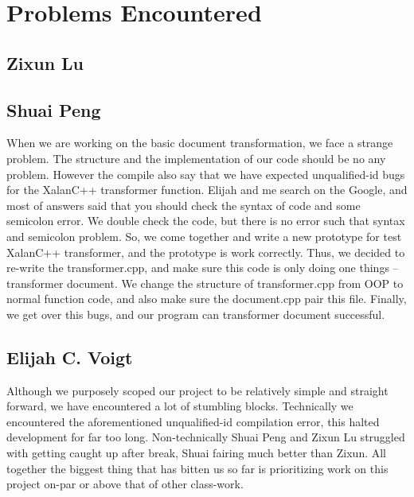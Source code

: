 \section{Problems Encountered}

\subsection{Zixun Lu}

\subsection{Shuai Peng}

When we are working on the basic document transformation, we face a strange problem.
The structure and the implementation of our code should be no any problem.
However the compile also say that we have expected unqualified-id bugs for the XalanC++ transformer function.
Elijah and me search on the Google, and most of answers said that you should check the syntax of code and some semicolon error.
We double check the code, but there is no error such that syntax and semicolon problem.
So, we come together and write a new prototype for test XalanC++ transformer, and the prototype is work correctly.
Thus, we decided to re-write the transformer.cpp, and make sure this code is only doing one things -- transformer document.
We change the structure of transformer.cpp from OOP to normal function code, and also make sure the document.cpp pair this file.
Finally, we get over this bugs, and our program can transformer document successful. 

\subsection{Elijah C. Voigt}

Although we purposely scoped our project to be relatively simple and straight forward, we have encountered a lot of stumbling blocks.
Technically we encountered the aforementioned unqualified-id compilation error, this halted development for far too long.
Non-technically Shuai Peng and Zixun Lu struggled with getting caught up after break, Shuai fairing much better than Zixun.
All together the biggest thing that has bitten us so far is prioritizing work on this project on-par or above that of other class-work.

